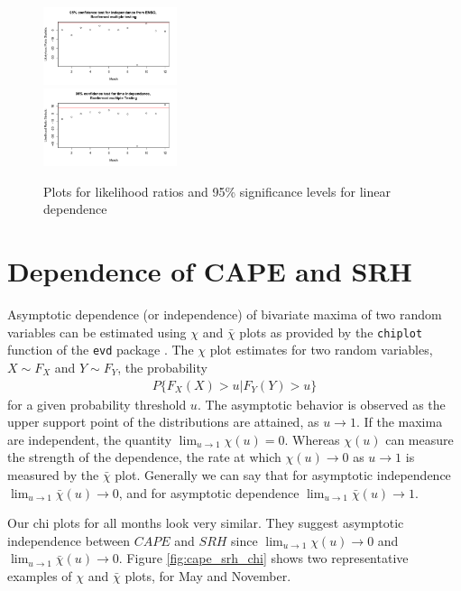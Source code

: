 \documentclass[10pt,conference,compsocconf]{IEEEtran}
\begin{document}
\begin{figure}
	\centering
	\includegraphics[width=0.35\textwidth]{../plots/enso_dependance_step.pdf}\\
	\includegraphics[width=0.35\textwidth]{../plots/time_dependance_step.pdf}
	\caption{Plots for likelihood ratios and 95\% significance levels for linear dependence}
	\label{fig:dependance_test_step}
\end{figure}

\section*{Dependence of CAPE and SRH}
Asymptotic dependence (or independence) of bivariate maxima of two random variables can be estimated using $\chi$ and $\bar{\chi}$ plots as provided by the \texttt{chiplot} function of the \texttt{evd} package \cite{evd}. The $\chi$ plot estimates for two random variables, $X \sim F_X$ and $Y \sim F_Y$, the probability 
\begin{align*}
	P\{F_X (X) > u | F_Y (Y) > u\}
\end{align*}
for a given probability threshold $u$. The asymptotic behavior is observed as the upper support point of the distributions are attained, as $u \to 1$. If the maxima are independent, the quantity $\lim_{u \to 1} \chi(u) = 0$. Whereas $\chi(u)$ can measure the strength of the dependence, the rate at which $\chi(u) \to 0$ as $u \to 1$ is measured by the $\bar{\chi}$ plot. Generally we can say that for asymptotic independence $\lim_{u \to 1} \bar{\chi}(u) \to 0$, and for asymptotic dependence $\lim_{u \to 1} \bar{\chi}(u) \to 1$. 
\par
Our chi plots for all months look very similar. They suggest asymptotic independence between $CAPE$ and $SRH$ since $\lim_{u \to 1} \chi(u) \to 0$ and $\lim_{u \to 1} \bar{\chi}(u) \to 0$. Figure \ref{fig:cape_srh_chi} shows two representative examples of $\chi$ and $\bar{\chi}$ plots, for May and November. 
\end{document}
